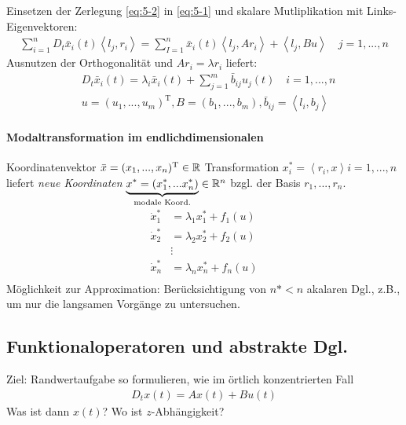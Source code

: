 Einsetzen der Zerlegung \eqref{eq:5-2} in \eqref{eq:5-1} und skalare Mutliplikation mit Links-Eigenvektoren:
\begin{align*}
\sum_{i=1}^{n}D_t\bar{x}_i(t)\left\langle l_j, r_i \right\rangle = \sum_{I=1}^{n}\bar{x}_i(t) \left\langle l_j, Ar_i \right\rangle + \left\langle l_j, Bu \right\rangle \quad j=1,...,n
\end{align*}
Ausnutzen der Orthogonalität und $Ar_i = \lambda r_i$ liefert:
\begin{align*}
&D_t\bar{x}_i(t)= \lambda_i \bar{x}_i(t) + \sum_{j=1}^{m}\bar{b}_{ij}u_j(t) \quad i=1,...,n \\
& u = (u_1,...,u_m)^\textrm{T}, B=(b_1,...,b_m), \bar{b}_{ij} = \left\langle l_i, b_j \right\rangle
\end{align*}
\paragraph{Modaltransformation im endlichdimensionalen}

Koordinatenvektor $\bar{x}=(x_1,...,x_n)^\textrm{T} \in \mathbb{R}$
Transformation $x_i^*=\left\langle r_i, x \right\rangle i = 1,...,n$ liefert \emph{neue Koordinaten} $\underbrace{x^*=(x_1^*,...x_n^*)}_{\textrm{modale Koord.}} \in \mathbb{R}^n$ bzgl. der Basis $r_1,...,r_n$.
\begin{align*}
\dot{x}^*_1 &= \lambda_1 x_1^* +f_1(u) \\
\dot{x}^*_2 &= \lambda_2 x_2^* +f_2(u) \\
&\vdots \\
\dot{x}^*_n &= \lambda_n x_n^* +f_n(u) \\
\end{align*}
Möglichkeit zur Approximation: Berücksichtigung von $n*<n$ akalaren Dgl., z.B., um nur die langsamen Vorgänge zu untersuchen.
\subsection{Funktionaloperatoren und abstrakte Dgl.}
Ziel: Randwertaufgabe so formulieren, wie im örtlich konzentrierten Fall
\begin{align*}
D_tx(t) = Ax(t) + Bu(t)
\end{align*}
Was ist dann $x(t)$? Wo ist $z$-Abhängigkeit?

